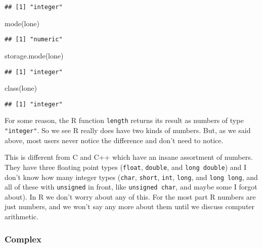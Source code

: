 \documentclass[
]{article}
\newenvironment{Shaded}{\begin{snugshade}}{\end{snugshade}}
\newcommand{\FunctionTok}[1]{\textcolor[rgb]{0.00,0.00,0.00}{#1}}
\newcommand{\NormalTok}[1]{#1}
\begin{document}
\begin{verbatim}
## [1] "integer"
\end{verbatim}

\begin{Shaded}
\begin{Highlighting}[]
\FunctionTok{mode}\NormalTok{(lone)}
\end{Highlighting}
\end{Shaded}

\begin{verbatim}
## [1] "numeric"
\end{verbatim}

\begin{Shaded}
\begin{Highlighting}[]
\FunctionTok{storage.mode}\NormalTok{(lone)}
\end{Highlighting}
\end{Shaded}

\begin{verbatim}
## [1] "integer"
\end{verbatim}

\begin{Shaded}
\begin{Highlighting}[]
\FunctionTok{class}\NormalTok{(lone)}
\end{Highlighting}
\end{Shaded}

\begin{verbatim}
## [1] "integer"
\end{verbatim}

For some reason, the R function \texttt{length} returns its result as
numbers of type \texttt{"integer"}. So we see R really does have two
kinds of numbers. But, as we said above, most users never notice the
difference and don't need to notice.

This is different from C and C++ which have an insane assortment of
numbers. They have three floating point types (\texttt{float},
\texttt{double}, and \texttt{long\ double}) and I don't know how many
integer types (\texttt{char}, \texttt{short}, \texttt{int},
\texttt{long}, and \texttt{long\ long}, and all of these with
\texttt{unsigned} in front, like \texttt{unsigned\ char}, and maybe some
I forgot about). In R we don't worry about any of this. For the most
part R numbers are just numbers, and we won't say any more about them
until we discuss computer arithmetic.

\hypertarget{complex}{%
\subsubsection{Complex}\label{complex}}
\end{document}
